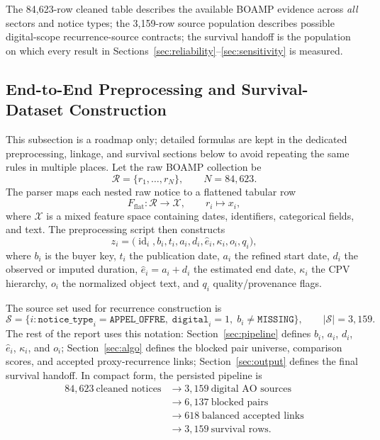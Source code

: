 \documentclass[11pt]{article}
\begin{document}
The 84{,}623-row cleaned table describes the available BOAMP evidence across
\emph{all} sectors and notice types; the 3{,}159-row source population
describes possible digital-scope recurrence-source contracts; the
survival handoff is the population on which every result in
Sections~\ref{sec:reliability}--\ref{sec:sensitivity} is measured.

\subsection{End-to-End Preprocessing and Survival-Dataset Construction}
\label{sec:endtoend-construction}
This subsection is a roadmap only; detailed formulas are kept in the dedicated
preprocessing, linkage, and survival sections below to avoid repeating the same
rules in multiple places. Let the raw BOAMP collection be
\[
\mathcal{R}=\{r_1,\ldots,r_N\}, \qquad N=84{,}623.
\]
The parser maps each nested raw notice to a flattened tabular row
\[
F_{\mathrm{flat}}:\mathcal{R}\rightarrow\mathcal{X},
\qquad r_i\mapsto x_i,
\]
where $\mathcal{X}$ is a mixed feature space containing dates, identifiers,
categorical fields, and text. The preprocessing script then constructs
\[
z_i=\bigl(\operatorname{id}_i,b_i,t_i,a_i,d_i,\hat e_i,\kappa_i,o_i,q_i\bigr),
\]
where $b_i$ is the buyer key, $t_i$ the publication date, $a_i$ the refined
start date, $d_i$ the observed or imputed duration, $\hat e_i=a_i+d_i$ the
estimated end date, $\kappa_i$ the CPV hierarchy, $o_i$ the normalized object
text, and $q_i$ quality/provenance flags.

The source set used for recurrence construction is
\[
\mathcal{S}=
\{i:\texttt{notice\_type}_i=\texttt{APPEL\_OFFRE},\;
\texttt{digital}_i=1,\; b_i\neq\texttt{MISSING}\},
\qquad |\mathcal{S}|=3{,}159.
\]
The rest of the report uses this notation: Section~\ref{sec:pipeline}
defines $b_i$, $a_i$, $d_i$, $\hat e_i$, $\kappa_i$, and $o_i$;
Section~\ref{sec:algo} defines the blocked pair universe, comparison scores, and
accepted proxy-recurrence links; Section~\ref{sec:output} defines the final
survival handoff. In compact form, the persisted pipeline is
\[
\begin{aligned}
84{,}623\ \text{cleaned notices}
&\longrightarrow 3{,}159\ \text{digital AO sources}\\
&\longrightarrow 6{,}137\ \text{blocked pairs}\\
&\longrightarrow 618\ \text{balanced accepted links}\\
&\longrightarrow 3{,}159\ \text{survival rows}.
\end{aligned}
\]
\end{document}
